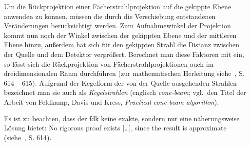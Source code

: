 Um die Rückprojektion einer Fächerstrahlprojektion auf die gekippte Ebene anwenden zu können, müssen die durch die
Verschiebung entstandenen Veränderungen berücksichtigt werden. Zum Aufnahmewinkel der Projektion kommt nun noch der
Winkel zwischen der gekippten Ebene und der mittleren Ebene hinzu, außerdem hat sich für den gekippten Strahl die
Distanz zwischen der Quelle und dem Detektor vergrößert. Berechnet man diese Faktoren mit ein, so lässt sich die
Rückprojektion von Fächerstrahlprojektionen auch im dreidimensionalen Raum durchführen (zur mathematischen Herleitung
siehe~\cite{fdk}, S. 614 -- 615). Aufgrund der Kegelform der von der Quelle ausgehenden Strahlen bezeichnet man sie auch
als \textit{Kegelstrahlen} (englisch \textit{cone-beam}; vgl.\ den Titel der Arbeit von Feldkamp, Davis und Kress,
\textit{Practical cone-beam algorithm}).

Es ist zu beachten, dass der \gls{fdk} keine exakte, sondern nur eine näherungsweise Lösung bietet: {\glqq}No rigorous
proof exists [\ldots], since the result is approximate{\grqq} (siehe~\cite{fdk}, S. 614).


